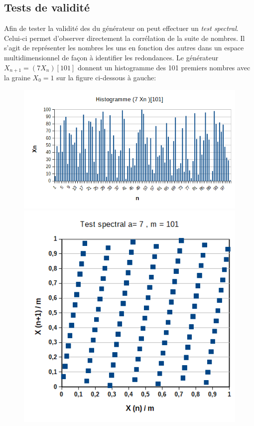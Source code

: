 \documentclass{scrartcl}
\begin{document}
\subsection{Tests de validité}
Afin de tester la validité des du générateur on peut effectuer un \textit{ test
  spectral}. Celui-ci permet d'observer directement la corrélation de la suite
de nombres.  Il s'agit de représenter les nombres les uns en fonction des autres
dans un espace multidimensionnel de façon à identifier les redondances.  Le
générateur $X_{n+1} =(7 X_{n})[101]$ donnent un histogramme des 101 premiers
nombres avec la graine $X_0 = 1$ sur la figure ci-dessous à gauche:
\begin{figure}
  \begin{center}
    \includegraphics[scale=0.4]{img/histo7Xn[101].png}
    \hspace{0.1\textwidth}
    \includegraphics[scale=0.4]{img/a7m101.png}
  \end{center}
\end{figure}
\end{document}
